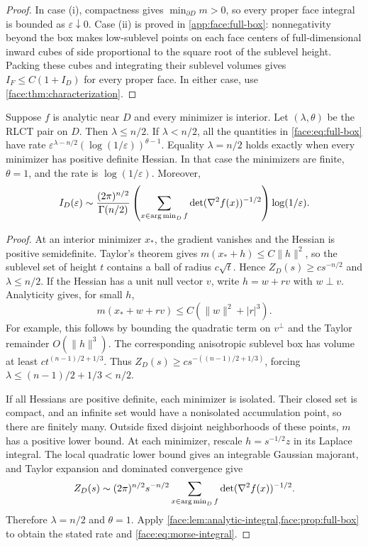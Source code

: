 \begin{proof}
In case (i), compactness gives $\min_{\partial D}m>0$, so every proper
face integral is bounded as $\varepsilon\downarrow0$.  Case (ii) is
proved in \cref{app:face:full-box}: nonnegativity beyond the box makes
low-sublevel points on each face centers of full-dimensional inward
cubes of side proportional to the square root of the sublevel height.
Packing these cubes and integrating their sublevel volumes gives
$I_F\le C(1+I_D)$ for every proper face.  In either case, use
\cref{face:thm:characterization}.
\end{proof}

\begin{corollary}
 \label{face:cor:interior}
Suppose $f$ is analytic near $D$ and every minimizer is interior.  Let
$(\lambda,\theta)$ be the RLCT pair on $D$.  Then $\lambda\le n/2$.
If $\lambda<n/2$, all the quantities in
\eqref{face:eq:full-box} have rate
$\varepsilon^{\lambda-n/2}(\log(1/\varepsilon))^{\theta-1}$.
Equality $\lambda=n/2$ holds exactly when every minimizer has positive
definite Hessian.  In that case the minimizers are finite,
$\theta=1$, and the rate is $\log(1/\varepsilon)$.  Moreover,
\begin{equation}
 \label{face:eq:morse-integral}
 I_D(\varepsilon)\sim
 \frac{(2\pi)^{n/2}}{\Gamma(n/2)}
 \left(\sum_{x\in\operatorname*{arg\,min}_D f}\det(\nabla^2 f(x))^{-1/2}\right)
 \log(1/\varepsilon).
\end{equation}
\end{corollary}

\begin{proof}
At an interior minimizer $x_*$, the gradient vanishes and the Hessian is
positive semidefinite.  Taylor's theorem gives
$m(x_*+h)\le C\|h\|^2$, so the sublevel set of height $t$ contains a
ball of radius $c\sqrt t$.  Hence
$Z_D(s)\ge c s^{-n/2}$ and $\lambda\le n/2$.
If the Hessian has a unit null vector $v$, write $h=w+rv$ with $w\perp v$.
Analyticity gives, for small $h$,
\[
 m(x_*+w+rv)\le C(\|w\|^2+|r|^3).
\]
For example, this follows by bounding the quadratic term on $v^\perp$
and the Taylor remainder $O(\|h\|^3)$.
The corresponding anisotropic sublevel box has volume at least
$ct^{(n-1)/2+1/3}$.  Thus
$Z_D(s)\ge cs^{-((n-1)/2+1/3)}$, forcing
$\lambda\le(n-1)/2+1/3<n/2$.

If all Hessians are positive definite, each minimizer is isolated.
Their closed set is compact, and an infinite set would have a
nonisolated accumulation point, so there are finitely many.  Outside
fixed disjoint neighborhoods of these points, $m$ has a positive lower
bound.  At each minimizer, rescale $h=s^{-1/2}z$ in its Laplace integral.
The local quadratic lower bound gives an integrable Gaussian majorant,
and Taylor expansion and dominated convergence give
\[
 Z_D(s)\sim (2\pi)^{n/2}s^{-n/2}
 \sum_{x\in\operatorname*{arg\,min}_D f}\det(\nabla^2f(x))^{-1/2}.
\]
Therefore $\lambda=n/2$ and $\theta=1$.
Apply \cref{face:lem:analytic-integral,face:prop:full-box} to obtain
the stated rate and \eqref{face:eq:morse-integral}.
\end{proof}

